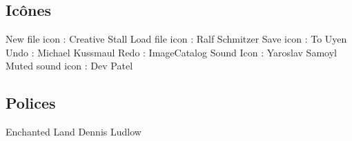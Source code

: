 \documentclass{article}
\begin{document}
\subsection*{Icônes}
New file icon : Creative Stall\newline
Load file icon : Ralf Schmitzer\newline
Save icon : To Uyen\newline
Undo : Michael Kussmaul\newline
Redo : ImageCatalog\newline
Sound Icon : Yaroslav Samoyl\newline
Muted sound icon : Dev Patel\newline
\subsection*{Polices}
Enchanted Land\newline
Dennis Ludlow


\end{document}
